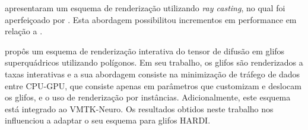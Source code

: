 \documentclass[
    12pt,                %
    oneside,            %
    a4paper,            %
    english,            %
    french,                %
    spanish,            %
    brazil                %
    ]{abntex2}
\begin{document}
 apresentaram um esquema de renderização utilizando \textit{ray casting}, no qual foi aperfeiçoado por \cite{almsick2011}. Esta abordagem possibilitou incrementos em performance em relação a .

 propôs um esquema de renderização interativa do tensor de difusão em glifos superquádricos \cite{Kindlmann2004} utilizando polígonos. Em seu trabalho, os glifos são renderizados a taxas interativas e a sua abordagem consiste na minimização de tráfego de dados entre CPU-GPU, que consiste apenas em parâmetros que customizam e deslocam os glifos, e o uso de renderização por instâncias. Adicionalmente, este esquema está integrado ao VMTK-Neuro. Os resultados obtidos neste trabalho nos influenciou a adaptar o seu esquema para glifos HARDI.












\end{document}
